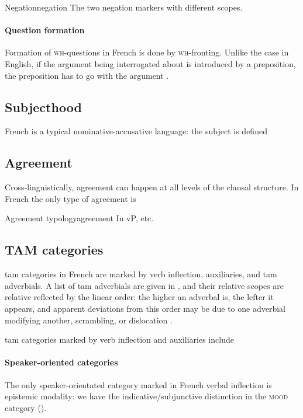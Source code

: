\documentclass[a4paper, oneside, 12pt]{report}
\newcommand*{\citepage}[1]{p.~{#1}}
\newcommand*{\citepages}[1]{pp.~{#1}}
\newcommand*{\category}[1]{\textsc{#1}}
\begin{document}
\begin{todobox}{Negation}{negation}
    The two negation markers with different scopes.
\end{todobox}

\paragraph*{Question formation}
Formation of \category{wh}-questions in French is done by \category{wh}-fronting.
Unlike the case in English, if the argument being interrogated about is introduced by a preposition,
the preposition has to go with the argument \citep[\citepage{60}]{rowlett2007syntax}.

\subsection{Subjecthood}

French is a typical nominative-accusative language:
the subject is defined 

\subsection{Agreement}

Cross-linguistically, agreement can happen at all levels of the clausal structure.
In French the only type of agreement is 

\begin{todobox}{Agreement typology}{agreement}
    In vP, etc.
\end{todobox}

\subsection{TAM categories}\label{sec:grammatical.clause.tam}
\ac{tam} categories in French are marked by verb inflection, auxiliaries,
and \ac{tam} adverbials.
A list of \ac{tam} adverbials are given in \citet[\citepage{103, (3)}]{rowlett2007syntax},
and their relative scopes are relative reflected by the linear order:
the higher an adverbal is, the lefter it appears,
and apparent deviations from this order may be due to 
one adverbial modifying another,
scrambling, or dislocation \citep[\citepages{104-105}]{rowlett2007syntax}.

\ac{tam} categories marked by verb inflection and auxiliaries include 

\paragraph*{Speaker-oriented categories} 
The only speaker-orientated category marked in French verbal inflection is epistemic modality:
we have the indicative/subjunctive distinction in the \category{mood} category
().
\end{document}
